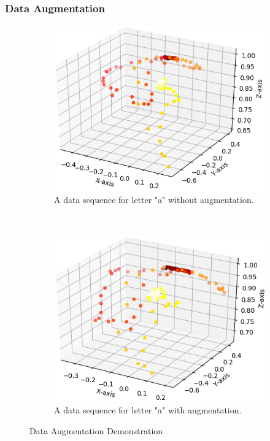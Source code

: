 \documentclass{article}
\begin{document}
\begin{multicols*}{2}
\subsubsection{Data Augmentation}
\begin{figure}[H]
    \raggedleft
    \begin{subfigure}[]{0.25\textwidth}
        \raggedleft
        \includegraphics[scale = 0.35]{Still_a_5.png}
        \caption{A data sequence for letter "a" without augmentation.}
    \end{subfigure}%
    ~ 
    \begin{subfigure}[]{0.25\textwidth}
        \centering
        \includegraphics[scale = 0.35]{Still_a_5_aug.png}
        \caption{A data sequence for letter "a" with augmentation.}
    \end{subfigure}
    \caption{Data Augmentation Demonstration}
\end{figure}


\end{multicols*}
\end{document}
